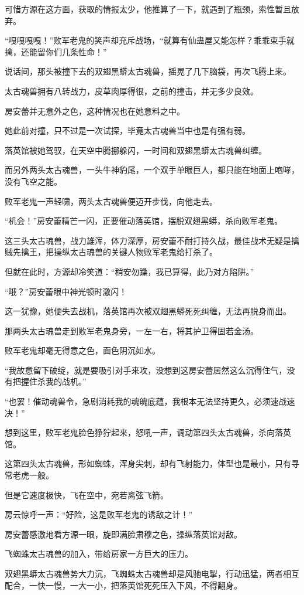 \begin{this_body}
可惜方源在这方面，获取的情报太少，他推算了一下，就遇到了瓶颈，索性暂且放弃。

“嘎嘎嘎嘎！”败军老鬼的笑声却充斥战场，“就算有仙蛊屋又能怎样？乖乖束手就擒，还能留你们几条性命！”

说话间，那头被撞下去的双翅黑蟒太古魂兽，摇晃了几下脑袋，再次飞腾上来。

太古魂兽拥有八转战力，皮草肉厚得很，之前的撞击，并无多少良效。

房安蕾并无意外之色，这种情况也在她意料之中。

她此前对撞，只不过是一次试探，毕竟太古魂兽当中也是有强有弱。

落英馆被她驾驭，在天空中腾挪躲闪，一时间和双翅黑蟒太古魂兽纠缠。

而另外两头太古魂兽，一头牛神豹尾，一个双手单眼巨人，都只能在地面上咆哮，没有飞空之能。

败军老鬼一声轻啸，两头太古魂兽便迈开步伐，向他走去。

“机会！”房安蕾精芒一闪，正要催动落英馆，摆脱双翅黑蟒，杀向败军老鬼。

这三头太古魂兽，战力雄浑，体力深厚，房安蕾不耐打持久战，最佳战术无疑是擒贼先擒王，把操纵太古魂兽的关键人物败军老鬼给打杀了。

但就在此时，方源却冷笑道：“稍安勿躁，我已算得，此乃对方陷阱。”

“哦？”房安蕾眼中神光顿时激闪！

这一犹豫，她便失去战机，落英馆再次被双翅黑蟒死死纠缠，无法再脱身而出。

那两头太古魂兽走到败军老鬼身旁，一左一右，将其护卫得固若金汤。

败军老鬼却毫无得意之色，面色阴沉如水。

“我故意留下破绽，就是要吸引对手来攻，没想到这房安蕾居然这么沉得住气，没有把握住杀我的战机。”

“也罢！催动魂兽令，急剧消耗我的魂魄底蕴，我根本无法坚持更久，必须速战速决！”

想到这里，败军老鬼脸色狰狞起来，怒吼一声，调动第四头太古魂兽，杀向落英馆。

这第四头太古魂兽，形如蜘蛛，浑身尖刺，却有飞射能力，体型也是最小，只有寻常老虎一般。

但是它速度极快，飞在空中，宛若离弦飞箭。

房云惊呼一声：“好险，这是败军老鬼的诱敌之计！”

房安蕾感激地看方源一眼，旋即满脸肃穆之色，操纵落英馆对敌。

飞蜘蛛太古魂兽的加入，带给房家一方巨大的压力。

双翅黑蟒太古魂兽势大力沉，飞蜘蛛太古魂兽却是风驰电掣，行动迅猛，两者相互配合，一快一慢，一大一小，把落英馆死死压入下风，不得翻身。


\end{this_body}
